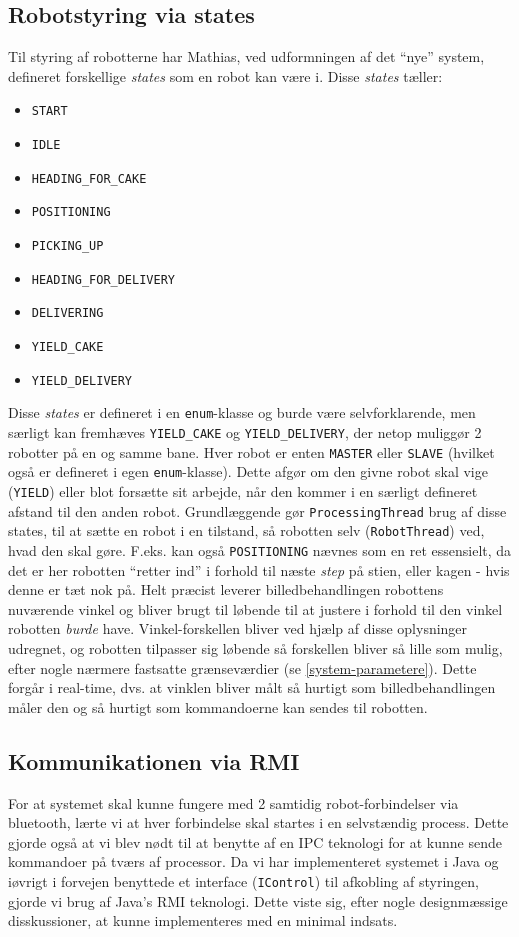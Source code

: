 \subsection{Robotstyring via states}
Til styring af robotterne har Mathias, ved udformningen af det "`nye"' system, defineret forskellige \textit{states} som en robot kan være i. Disse \textit{states} tæller:
\begin{itemize}
\item \texttt{START}
\item \texttt{IDLE}
\item \texttt{HEADING\_FOR\_CAKE}
\item \texttt{POSITIONING}
\item \texttt{PICKING\_UP}
\item \texttt{HEADING\_FOR\_DELIVERY}
\item \texttt{DELIVERING}
\item \texttt{YIELD\_CAKE}
\item \texttt{YIELD\_DELIVERY}
\end{itemize}
Disse \textit{states} er defineret i en \texttt{enum}-klasse og burde være selvforklarende, men særligt kan fremhæves \texttt{YIELD\_CAKE} og \texttt{YIELD\_DELIVERY}, der netop muliggør 2 robotter på en og samme bane. Hver robot er enten \texttt{MASTER} eller \texttt{SLAVE} (hvilket også er defineret i egen \texttt{enum}-klasse). Dette afgør om den givne robot skal vige (\texttt{YIELD}) eller blot forsætte sit arbejde, når den kommer i en særligt defineret afstand til den anden robot. Grundlæggende gør \texttt{ProcessingThread} brug af disse states, til at sætte en robot i en tilstand, så robotten selv (\texttt{RobotThread}) ved, hvad den skal gøre.
F.eks. kan også \texttt{POSITIONING} nævnes som en ret essensielt, da det er her robotten “retter ind” i forhold til næste \textit{step} på stien, eller kagen - hvis denne er tæt nok på. Helt præcist leverer billedbehandlingen robottens nuværende vinkel og bliver brugt til løbende til at justere i forhold til den vinkel robotten \textit{burde} have. Vinkel-forskellen bliver ved hjælp af disse oplysninger udregnet, og robotten tilpasser sig løbende så forskellen bliver så lille som mulig, efter nogle nærmere fastsatte grænseværdier (se \vref{system-parametere}). Dette forgår i real-time, dvs. at vinklen bliver målt så hurtigt som billedbehandlingen måler den og så hurtigt som kommandoerne kan sendes til robotten.

\subsection{Kommunikationen via RMI}
For at systemet skal kunne fungere med 2 samtidig robot-forbindelser via bluetooth, lærte vi at hver forbindelse skal startes i en selvstændig process. Dette gjorde også at vi blev nødt til at benytte af en IPC teknologi for at kunne sende kommandoer på tværs af processor.
Da vi har implementeret systemet i Java og iøvrigt i forvejen benyttede et interface (\texttt{IControl}) til afkobling af styringen, gjorde vi brug af Java’s RMI teknologi. Dette viste sig, efter nogle designmæssige disskussioner, at kunne implementeres med en minimal indsats.

